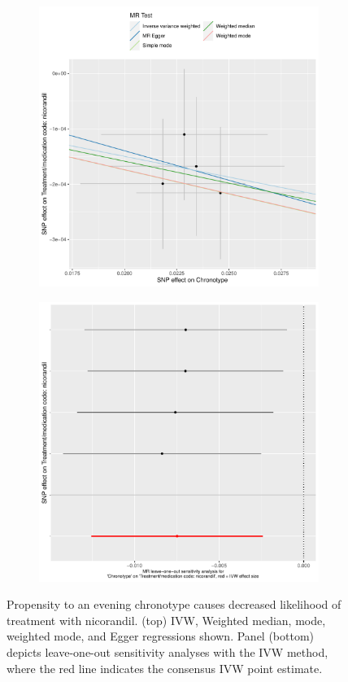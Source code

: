 \documentclass{article}
\begin{document}
\begin{figure}[htbp]
\begin{subfigure}{\linewidth}
\centering
	\includegraphics[width=.8\linewidth]{Figs/Analysis2/Chronotype_vs_Treatment_medication_code_nicorandil.Scatterplots.pdf}
\label{nicScatter}
\end{subfigure}
\begin{subfigure}{\linewidth}
\centering
	\includegraphics[width=.8\linewidth,keepaspectratio]{Figs/Analysis2/Chronotype_vs_Treatment_medication_code_nicorandil.LOOplots.pdf}
\label{nicLoo}
\end{subfigure}
\caption{Propensity to an evening chronotype causes decreased likelihood of treatment with nicorandil. (top) IVW, Weighted median, mode, weighted mode, and Egger regressions shown. Panel (bottom) depicts leave-one-out sensitivity analyses with the IVW method, where the red line indicates the consensus IVW point estimate.}
\label{nic}
\end{figure}
\end{document}
